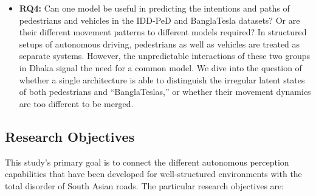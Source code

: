 \documentclass[12pt, a4paper]{article}
\begin{document}
\begin{itemize}
\item \textbf{RQ4:} Can one model be useful in predicting the intentions and paths of pedestrians and vehicles in the IDD-PeD and BanglaTesla datasets? Or are their different movement patterns to different models required? In structured setups of autonomous driving, pedestrians as well as vehicles are treated as separate systems. However, the unpredictable interactions of these two groups in Dhaka signal the need for a common model. We dive into the question of whether a single architecture is able to distinguish the irregular latent states of both pedestrians and “BanglaTeslas,” or whether their movement dynamics are too different to be merged.
\end{itemize}

\subsection{Research Objectives}

This study's primary goal is to connect the different autonomous perception capabilities that have been developed for well-structured environments with the total disorder of South Asian roads. The particular research objectives are:
\end{document}
